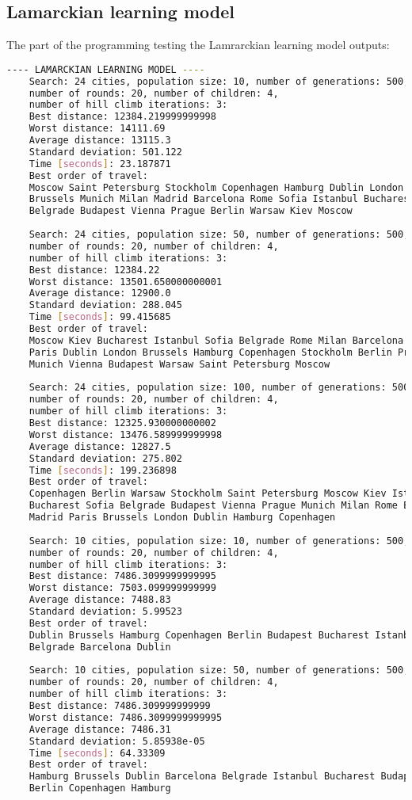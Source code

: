 \documentclass{article}
\begin{document}
\subsection{Lamarckian learning model}
The part of the programming testing the Lamrarckian learning model outputs:
\begin{lstlisting}[language=bash]
	---- LAMARCKIAN LEARNING MODEL ----
	Search: 24 cities, population size: 10, number of generations: 500, 
	number of rounds: 20, number of children: 4, 
	number of hill climb iterations: 3: 
	Best distance: 12384.219999999998
	Worst distance: 14111.69
	Average distance: 13115.3
	Standard deviation: 501.122
	Time [seconds]: 23.187871
	Best order of travel: 
	Moscow Saint Petersburg Stockholm Copenhagen Hamburg Dublin London Paris 
	Brussels Munich Milan Madrid Barcelona Rome Sofia Istanbul Bucharest 
	Belgrade Budapest Vienna Prague Berlin Warsaw Kiev Moscow
 
	Search: 24 cities, population size: 50, number of generations: 500, 
	number of rounds: 20, number of children: 4, 
	number of hill climb iterations: 3: 
	Best distance: 12384.22
	Worst distance: 13501.650000000001
	Average distance: 12900.0
	Standard deviation: 288.045
	Time [seconds]: 99.415685
	Best order of travel: 
	Moscow Kiev Bucharest Istanbul Sofia Belgrade Rome Milan Barcelona Madrid 
	Paris Dublin London Brussels Hamburg Copenhagen Stockholm Berlin Prague 
	Munich Vienna Budapest Warsaw Saint Petersburg Moscow
 
	Search: 24 cities, population size: 100, number of generations: 500, 
	number of rounds: 20, number of children: 4, 
	number of hill climb iterations: 3: 
	Best distance: 12325.930000000002
	Worst distance: 13476.589999999998
	Average distance: 12827.5
	Standard deviation: 275.802
	Time [seconds]: 199.236898
	Best order of travel: 
	Copenhagen Berlin Warsaw Stockholm Saint Petersburg Moscow Kiev Istanbul 
	Bucharest Sofia Belgrade Budapest Vienna Prague Munich Milan Rome Barcelona 
	Madrid Paris Brussels London Dublin Hamburg Copenhagen
 
	Search: 10 cities, population size: 10, number of generations: 500, 
	number of rounds: 20, number of children: 4, 
	number of hill climb iterations: 3: 
	Best distance: 7486.3099999999995
	Worst distance: 7503.099999999999
	Average distance: 7488.83
	Standard deviation: 5.99523
	Best order of travel: 
	Dublin Brussels Hamburg Copenhagen Berlin Budapest Bucharest Istanbul 
	Belgrade Barcelona Dublin
 
	Search: 10 cities, population size: 50, number of generations: 500, 
	number of rounds: 20, number of children: 4, 
	number of hill climb iterations: 3: 
	Best distance: 7486.309999999999
	Worst distance: 7486.3099999999995
	Average distance: 7486.31
	Standard deviation: 5.85938e-05
	Time [seconds]: 64.33309
	Best order of travel: 
	Hamburg Brussels Dublin Barcelona Belgrade Istanbul Bucharest Budapest 
	Berlin Copenhagen Hamburg
 

\end{lstlisting}
\end{document}
